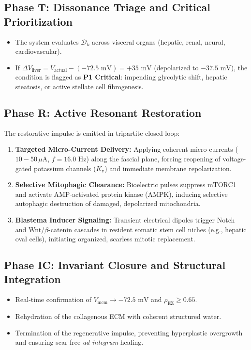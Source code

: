 \documentclass[10pt,twocolumn]{article}
\begin{document}
\subsection{Phase T: Dissonance Triage and Critical Prioritization}
\begin{itemize}
  \item The system evaluates $\mathcal{D}_k$ across visceral organs (hepatic, renal, neural, cardiovascular).
  \item If $\Delta V_{\text{liver}} = V_{\text{actual}} - (-72.5\text{ mV}) = +35\text{ mV}$ (depolarized to $-37.5\text{ mV}$), the condition is flagged as \textbf{P1 Critical}: impending glycolytic shift, hepatic steatosis, or active stellate cell fibrogenesis.
\end{itemize}


\subsection{Phase R: Active Resonant Restoration}
The restorative impulse is emitted in tripartite closed loop:
\begin{enumerate}
  \item \textbf{Targeted Micro-Current Delivery:} Applying coherent micro-currents ($10 - 50\,\mu\text{A}$, $f = 16.0\text{ Hz}$) along the fascial plane, forcing reopening of voltage-gated potassium channels ($K_{\text{v}}$) and immediate membrane repolarization.
  \item \textbf{Selective Mitophagic Clearance:} Bioelectric pulses suppress mTORC1 and activate AMP-activated protein kinase (AMPK), inducing selective autophagic destruction of damaged, depolarized mitochondria.
  \item \textbf{Blastema Inducer Signaling:} Transient electrical dipoles trigger Notch and Wnt/$\beta$-catenin cascades in resident somatic stem cell niches (e.g., hepatic oval cells), initiating organized, scarless mitotic replacement.
\end{enumerate}


\subsection{Phase IC: Invariant Closure and Structural Integration}
\begin{itemize}
  \item Real-time confirmation of $V_{\text{mem}} \to -72.5\text{ mV}$ and $\rho_{\text{EZ}} \ge 0.65$.
  \item Rehydration of the collagenous ECM with coherent structured water.
  \item Termination of the regenerative impulse, preventing hyperplastic overgrowth and ensuring scar-free \textit{ad integrum} healing.
\end{itemize}
\end{document}
